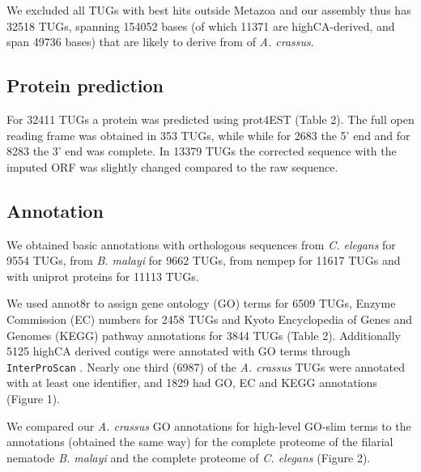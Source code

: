 \documentclass[10pt]{bmc_article}
\newenvironment{bmcformat}{\begin{raggedright}\baselineskip20pt\sloppy\setboolean{publ}{false}}{\end{raggedright}\baselineskip20pt\sloppy}
\begin{document}
\begin{bmcformat}
We excluded all TUGs with best hits outside Metazoa and our assembly
thus has 32518 TUGs, spanning
154052 bases (of which
11371 are highCA-derived, and
span 49736 bases) that
are likely to derive from of \textit{A. crassus}.

\subsection*{Protein prediction}
















For
32411
TUGs a protein was predicted using prot4EST
\cite{wasmuth_prot4est:_2004} (Table 2). The full open reading frame
was obtained in
353 TUGs, while
while for 2683 the
5’ end and for 8283
the 3' end was complete. In 13379 TUGs the
corrected sequence with the imputed ORF was slightly changed compared
to the raw sequence.

\subsection*{Annotation}

We obtained basic annotations with orthologous sequences from
\textit{C. elegans} for
9554 TUGs,
from \textit{B. malayi} for
9662 TUGs,
from nempep \cite{parkinson_nembase:resource_2004, pmid21550347} for
11617
TUGs and with uniprot proteins for
11113 TUGs.

We used annot8r \cite{schmid_annot8r:_2008} to assign gene ontology
(GO) terms for 6509 TUGs, Enzyme Commission (EC) numbers for
2458 TUGs and Kyoto Encyclopedia of Genes and Genomes (KEGG)
pathway annotations for 3844 TUGs (Table 2). Additionally
5125 highCA derived contigs were annotated with GO terms
through \texttt{InterProScan} \cite{pmid11590104}. Nearly one third
(6987) of the \textit{A. crassus} TUGs were
annotated with at least one identifier, and 1829 had
GO, EC and KEGG annotations (Figure 1).

We compared our \textit{A. crassus} GO annotations for high-level
GO-slim terms to the annotations (obtained the same way) for the
complete proteome of the filarial nematode \textit{B. malayi} and the
complete proteome of \textit{C. elegans} (Figure 2).


\end{bmcformat}
\end{document}
